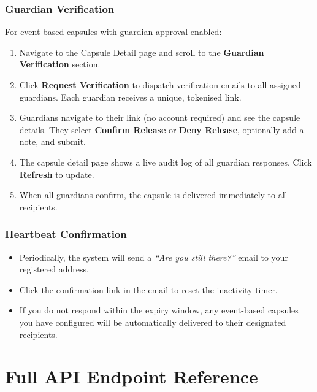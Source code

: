 \documentclass[12pt, a4paper]{article}
\begin{document}
\begin{appendices}
\subsubsection{Guardian Verification}

For event-based capsules with guardian approval enabled:

\begin{enumerate}
  \item Navigate to the Capsule Detail page and scroll to the \textbf{Guardian Verification} section.
  \item Click \textbf{Request Verification} to dispatch verification emails to all assigned guardians. Each guardian receives a unique, tokenised link.
  \item Guardians navigate to their link (no account required) and see the capsule details. They select \textbf{Confirm Release} or \textbf{Deny Release}, optionally add a note, and submit.
  \item The capsule detail page shows a live audit log of all guardian responses. Click \textbf{Refresh} to update.
  \item When all guardians confirm, the capsule is delivered immediately to all recipients.
\end{enumerate}

\subsubsection{Heartbeat Confirmation}

\begin{itemize}
  \item Periodically, the system will send a \textit{``Are you still there?''} email to your registered address.
  \item Click the confirmation link in the email to reset the inactivity timer.
  \item If you do not respond within the expiry window, any event-based capsules you have configured will be automatically delivered to their designated recipients.
\end{itemize}

\section{Full API Endpoint Reference}
\label{appendix:api}


\end{appendices}
\end{document}
